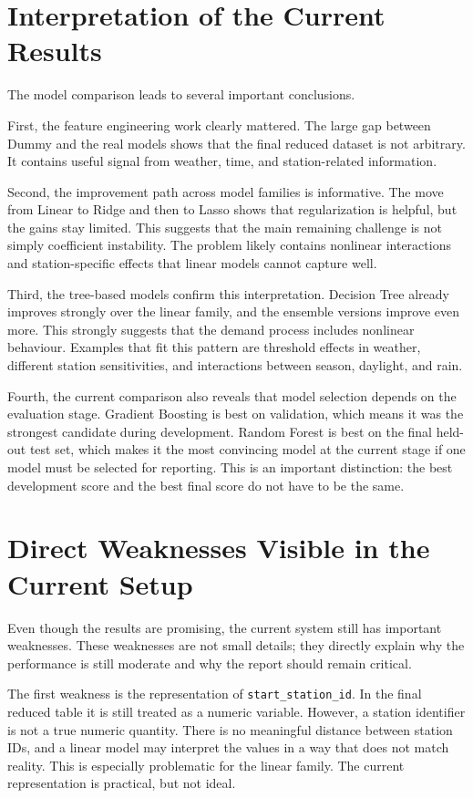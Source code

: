 \documentclass[conference]{IEEEtran}
\begin{document}
\section{Interpretation of the Current Results}
The model comparison leads to several important conclusions.

First, the feature engineering work clearly mattered. The large gap between Dummy and the real models 
shows that the final reduced dataset is not arbitrary. It contains useful signal from weather, time, 
and station-related information.

Second, the improvement path across model families is informative. The move from Linear to Ridge and 
then to Lasso shows that regularization is helpful, but the gains stay limited. This suggests that the 
main remaining challenge is not simply coefficient instability. The problem likely contains nonlinear 
interactions and station-specific effects that linear models cannot capture well.

Third, the tree-based models confirm this interpretation. Decision Tree already improves strongly over 
the linear family, and the ensemble versions improve even more. This strongly suggests that the demand 
process includes nonlinear behaviour. Examples that fit this pattern are threshold effects in weather, 
different station sensitivities, and interactions between season, daylight, and rain.

Fourth, the current comparison also reveals that model selection depends on the evaluation stage. 
Gradient Boosting is best on validation, which means it was the strongest candidate during development. 
Random Forest is best on the final held-out test set, which makes it the most convincing model at the 
current stage if one model must be selected for reporting. This is an important distinction: the best 
development score and the best final score do not have to be the same.

\section{Direct Weaknesses Visible in the Current Setup}
Even though the results are promising, the current system still has important weaknesses. 
These weaknesses are not small details; they directly explain why the performance is still moderate 
and why the report should remain critical.

The first weakness is the representation of \texttt{start\_station\_id}. In the final reduced table it 
is still treated as a numeric variable. However, a station identifier is not a true numeric quantity. 
There is no meaningful distance between station IDs, and a linear model may interpret the values in a 
way that does not match reality. This is especially problematic for the linear family. The current 
representation is practical, but not ideal.
\end{document}
